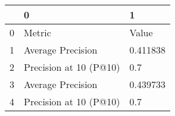 \begin{tabular}{lll}
\toprule
{} &                       0 &         1 \\
\midrule
0 &                  Metric &     Value \\
1 &       Average Precision &  0.411838 \\
2 &  Precision at 10 (P@10) &       0.7 \\
3 &       Average Precision &  0.439733 \\
4 &  Precision at 10 (P@10) &       0.7 \\
\bottomrule
\end{tabular}
